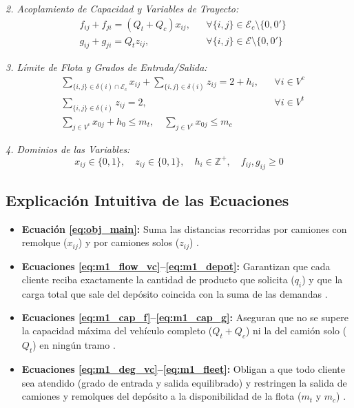 \documentclass[letter, 10pt]{article}
\begin{document}
\textit{2. Acoplamiento de Capacidad y Variables de Trayecto:}
\begin{align}
& f_{ij} + f_{ji} = (Q_t + Q_c) x_{ij}, && \forall \{i,j\} \in \mathcal{E}_c \setminus \{0, 0'\} \label{eq:m1_cap_f} \\
& g_{ij} + g_{ji} = Q_t z_{ij}, && \forall \{i,j\} \in \mathcal{E} \setminus \{0, 0'\} \label{eq:m1_cap_g}
\end{align}

\textit{3. L\'imite de Flota y Grados de Entrada/Salida:}
\begin{align}
& \sum_{\{i,j\} \in \delta(i) \cap \mathcal{E}_c} x_{ij} + \sum_{\{i,j\} \in \delta(i)} z_{ij} = 2 + h_i, && \forall i \in V^c \label{eq:m1_deg_vc} \\
& \sum_{\{i,j\} \in \delta(i)} z_{ij} = 2, && \forall i \in V^t \label{eq:m1_deg_vt} \\
& \sum_{j \in V^c} x_{0j} + h_0 \le m_t, \quad \sum_{j \in V^c} x_{0j} \le m_c && \label{eq:m1_fleet}
\end{align}

\textit{4. Dominios de las Variables:}
\begin{equation}
x_{ij} \in \{0, 1\}, \quad z_{ij} \in \{0, 1\}, \quad h_i \in \mathbb{Z}^+, \quad f_{ij}, g_{ij} \ge 0 \label{eq:m1_dom}
\end{equation}

\subsection{Explicaci\'on Intuitiva de las Ecuaciones}
\begin{itemize}
    \item \textbf{Ecuaci\'on \eqref{eq:obj_main}:} Suma las distancias recorridas por camiones con remolque ($x_{ij}$) y por camiones solos ($z_{ij}$) \cite{bartolini2020two}.
    \item \textbf{Ecuaciones \eqref{eq:m1_flow_vc}--\eqref{eq:m1_depot}:} Garantizan que cada cliente reciba exactamente la cantidad de producto que solicita ($q_i$) y que la carga total que sale del dep\'osito coincida con la suma de las demandas \cite{bartolini2020two}.
    \item \textbf{Ecuaciones \eqref{eq:m1_cap_f}--\eqref{eq:m1_cap_g}:} Aseguran que no se supere la capacidad m\'axima del veh\'iculo completo ($Q_t + Q_c$) ni la del cami\'on solo ($Q_t$) en ning\'un tramo \cite{bartolini2020two}.
    \item \textbf{Ecuaciones \eqref{eq:m1_deg_vc}--\eqref{eq:m1_fleet}:} Obligan a que todo cliente sea atendido (grado de entrada y salida equilibrado) y restringen la salida de camiones y remolques del dep\'osito a la disponibilidad de la flota ($m_t$ y $m_c$) \cite{bartolini2020two}.
\end{itemize}
\end{document}
